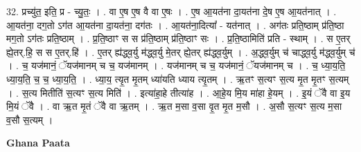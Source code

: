 \documentclass[17pt]{extarticle}
\begin{document}
32. प्रच्यु॑त॒ इति॒ प्र - च्यु॒तः॒ । . वा ए॒ष ए॒ष वै वा ए॒षः । . ए॒ष आ॒यत॑ना दा॒यत॑ना दे॒ष ए॒ष आ॒यत॑नात् । . आ॒यत॑ना॒ दग॒तो ऽग॑त आ॒यत॑ना दा॒यत॑ना॒ दग॑तः । . आ॒यत॑ना॒दित्या᳚ - यत॑नात् । . अग॑तः प्रति॒ष्ठाम् प्र॑ति॒ष्ठा मग॒तो ऽग॑तः प्रति॒ष्ठाम् । . प्र॒ति॒ष्ठाꣳ स स प्र॑ति॒ष्ठाम् प्र॑ति॒ष्ठाꣳ सः । . प्र॒ति॒ष्ठामिति॑ प्रति - स्थाम् । . स ए॒तर् ह्ये॒तर्.हि॒ स स ए॒तर्.हि॑ । . ए॒तर् ह्य॑द्ध्व॒र्यु म॑द्ध्व॒र्यु मे॒तर् ह्ये॒तर् ह्य॑द्ध्व॒र्युम् । . अ॒द्ध्व॒र्युम् च॑ चाद्ध्व॒र्यु म॑द्ध्व॒र्युम् च॑ । . च॒ यज॑मानं॒ ॅयज॑मानम् च च॒ यज॑मानम् । . यज॑मानम् च च॒ यज॑मानं॒ ॅयज॑मानम् च । . च॒ ध्या॒य॒ति॒ ध्या॒य॒ति॒ च॒ च॒ ध्या॒य॒ति॒ । . ध्या॒य॒ त्यृ॒त मृ॒तम् ध्या॑यति ध्याय त्यृ॒तम् । . ऋ॒तꣳ स॒त्यꣳ स॒त्य मृ॒त मृ॒तꣳ स॒त्यम् । . स॒त्य मितीति॑ स॒त्यꣳ स॒त्य मिति॑ । . इत्या॑हा॒हे तीत्या॑ह । . आ॒हे॒य मि॒य मा॑हा हे॒यम् । . इ॒यं ॅवै वा इ॒य मि॒यं ॅवै । . वा ऋ॒त मृ॒तं ॅवै वा ऋ॒तम् । . ऋ॒त म॒सा व॒सा वृ॒त मृ॒त म॒सौ । . अ॒सौ स॒त्यꣳ स॒त्य म॒सा व॒सौ स॒त्यम् । \newline

\textbf{Ghana Paata } \newline
\end{document}
